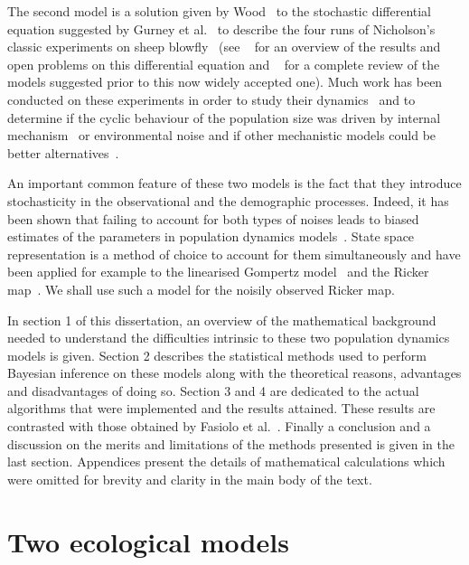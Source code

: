 \documentclass[12pt]{article}
\begin{document}
	The second model is a solution given by Wood~\cite{wood2010statistical} to the stochastic differential equation suggested by Gurney et al.~\cite{gurney1980nicholson} to describe the four runs of Nicholson’s classic experiments on sheep blowfly~\cite{nicholson1954outline, nicholson1957self} (see ~\cite{berezansky2010nicholson} for an overview of the results and open problems on this differential equation and ~\cite{oster1978population} for a complete review of the models suggested prior to this now widely accepted one). Much work has been conducted on these experiments in order to study their dynamics~\cite{brillinger1980empirical, brillinger2012nicholson} and to determine if the cyclic behaviour of the population size was driven by internal mechanism~\cite{gurney1980nicholson, wood2010statistical} or environmental noise and if other mechanistic models could be better alternatives~\cite{kendall1999populations}.
	
	An important common feature of these two models is the fact that they introduce stochasticity in the observational and the demographic processes. Indeed, it has been shown that failing to account for both types of noises leads to biased estimates of the parameters in population dynamics models~\cite{stenseth2003seasonality, carroll2006measurement, freckleton2006census}. State space representation is a method of choice to account for them simultaneously and have been applied for example to the linearised Gompertz model~\cite{meyer1999bugs, viljugrein2005density, wang2006spatial} and the Ricker map~\cite{de2002fitting, calder2003incorporating}. We shall use such a model for the noisily observed Ricker map.
	
	In section 1 of this dissertation, an overview of the mathematical background needed to understand the difficulties intrinsic to these two population dynamics models is given. Section 2 describes the statistical methods used to perform Bayesian inference on these models along with the theoretical reasons, advantages and disadvantages of doing so. Section 3 and 4 are dedicated to the actual algorithms that were implemented and the results attained. These results are contrasted with those obtained by Fasiolo et al.~\cite{fasiolo2014statistical}. Finally a conclusion and a discussion on the merits and limitations of the methods presented is given in the last section. Appendices present the details of mathematical calculations which were omitted for brevity and clarity in the main body of the text.
	
	\clearpage
	\section{Two ecological models}
\end{document}
